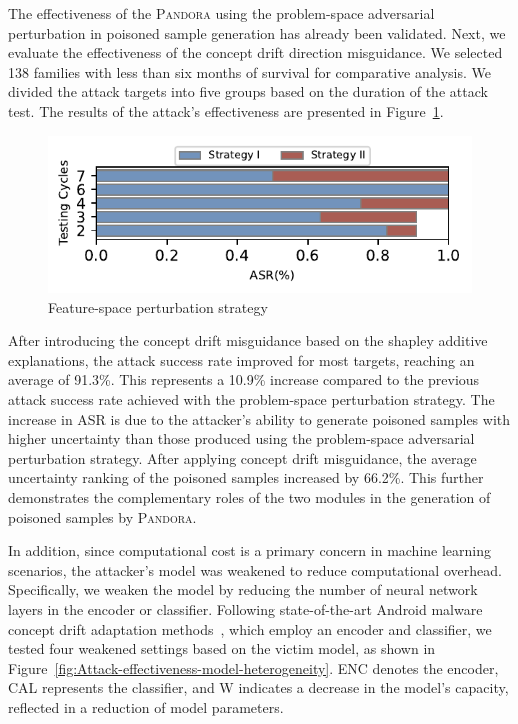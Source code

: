 \documentclass[lettersize,journal]{IEEEtran}
\newcommand{\pandora}{{\scshape Pandora}\xspace}
\begin{document}
The effectiveness of the \pandora using the problem-space adversarial perturbation in poisoned sample generation has already been validated. 
Next, we evaluate the effectiveness of the concept drift direction misguidance.
We selected 138 families with less than six months of survival for comparative analysis. 
We divided the attack targets into five groups based on the duration of the attack test.
The results of the attack’s effectiveness are presented in Figure~\ref{fig:feature-space perturbation strategy}.
\begin{figure}[h!]
	\centering
	\includegraphics[width=\linewidth,keepaspectratio]{Graph/Evaluation/Figure26.pdf}
	\caption{Feature-space perturbation strategy}
	\label{fig:feature-space perturbation strategy}
\end{figure}
After introducing the concept drift misguidance based on the shapley additive explanations, the attack success rate improved for most targets, reaching an average of 91.3\%.
This represents a 10.9\% increase compared to the previous attack success rate achieved with the problem-space perturbation strategy.
The increase in ASR is due to the attacker’s ability to generate poisoned samples with higher uncertainty than those produced using the problem-space adversarial perturbation strategy.
After applying concept drift misguidance, the average uncertainty ranking of the poisoned samples increased by 66.2\%.
This further demonstrates the complementary roles of the two modules in the generation of poisoned samples by \pandora.

In addition, since computational cost is a primary concern in machine learning scenarios, the attacker’s model was weakened to reduce computational overhead.
Specifically, we weaken the model by reducing the number of neural network layers in the encoder or classifier.
Following state-of-the-art Android malware concept drift adaptation methods~\cite{2023-Usenix-chenyizhen}, which employ an encoder and classifier, we tested four weakened settings based on the victim model, as shown in Figure~\ref{fig:Attack-effectiveness-model-heterogeneity}.
ENC denotes the encoder, CAL represents the classifier, and W indicates a decrease in the model’s capacity, reflected in a reduction of model parameters.
\end{document}
